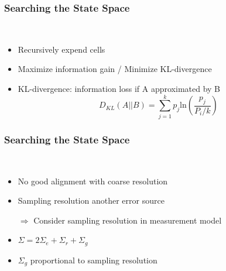 \begin{frame}
  \frametitle{Searching the State Space}
  \begin{description}[]
  \item[Derivation Step] \hfill \\
  \begin{itemize}
  \item Recursively expend cells\\
  \pause
  \item Maximize information gain / Minimize KL-divergence\\
  \pause
  \item KL-divergence: information loss if A approximated by B
  $$D_{KL}(A||B)=\sum_{j=1}^k p_j \mathrm{ln}\left(\frac{p_j}{P_i/k}\right)$$
  \end{itemize}
  \end{description}
\end{frame}

\begin{frame}
  \frametitle{Searching the State Space}
  \begin{description}[]
  \item[Annealing Dynamic Histogram (ADH)] \hfill \\
  \begin{itemize}
  \item No good alignment with coarse resolution
  \item Sampling resolution another error source
  \item[$\Rightarrow$] Consider sampling resolution in measurement model
  \item $\Sigma = 2\Sigma_e+\Sigma_r+\Sigma_g$
  \item $\Sigma_g$ proportional to sampling resolution
  \end{itemize}
  \end{description}
\end{frame}

